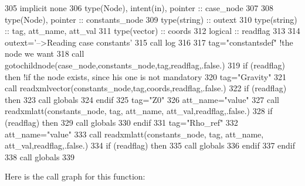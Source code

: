 \begin{DoxyCode}
305     \textcolor{keywordtype}{implicit none}
306     \textcolor{keywordtype}{type}(Node), \textcolor{keywordtype}{intent(in)}, \textcolor{keywordtype}{pointer} :: case\_node
307 
308     \textcolor{keywordtype}{type}(Node), \textcolor{keywordtype}{pointer} :: constants\_node
309     \textcolor{keywordtype}{type}(string) :: outext
310     \textcolor{keywordtype}{type}(string) :: tag, att\_name, att\_val
311     \textcolor{keywordtype}{type}(vector) :: coords
312     \textcolor{keywordtype}{logical} :: readflag
313 
314     outext=\textcolor{stringliteral}{'-->Reading case constants'}
315     \textcolor{keyword}{call }log%
316 
317     tag=\textcolor{stringliteral}{"constantsdef"}    \textcolor{comment}{!the node we want}
318     \textcolor{keyword}{call }gotochildnode(case\_node,constants\_node,tag,readflag,.false.)
319     \textcolor{keywordflow}{if} (readflag) \textcolor{keywordflow}{then} \textcolor{comment}{!if the node exists, since his one is not mandatory}
320       tag=\textcolor{stringliteral}{"Gravity"}
321       \textcolor{keyword}{call }readxmlvector(constants\_node,tag,coords,readflag,.false.)
322       \textcolor{keywordflow}{if} (readflag) \textcolor{keywordflow}{then}
323         \textcolor{keyword}{call }globals%
324 \textcolor{keywordflow}{      endif}
325       tag=\textcolor{stringliteral}{"Z0"}
326       att\_name=\textcolor{stringliteral}{"value"}
327       \textcolor{keyword}{call }readxmlatt(constants\_node, tag, att\_name, att\_val,readflag,.false.)
328       \textcolor{keywordflow}{if} (readflag) \textcolor{keywordflow}{then}
329         \textcolor{keyword}{call }globals%
330 \textcolor{keywordflow}{      endif}
331       tag=\textcolor{stringliteral}{"Rho\_ref"}
332       att\_name=\textcolor{stringliteral}{"value"}
333       \textcolor{keyword}{call }readxmlatt(constants\_node, tag, att\_name, att\_val,readflag,.false.)
334       \textcolor{keywordflow}{if} (readflag) \textcolor{keywordflow}{then}
335         \textcolor{keyword}{call }globals%
336 \textcolor{keywordflow}{      endif}
337 \textcolor{keywordflow}{    endif}
338     \textcolor{keyword}{call }globals%
339 
\end{DoxyCode}
Here is the call graph for this function\+:\nopagebreak
